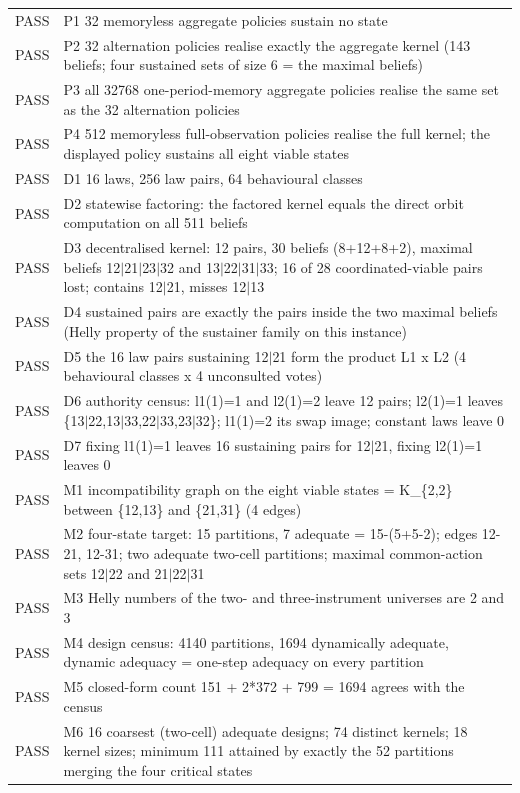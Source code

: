 \documentclass[11pt,a4paper]{article}
\theoremstyle{plain}
\theoremstyle{definition}
\theoremstyle{remark}
\begin{document}
\begin{longtable}{lp{}}
PASS & P1 32 memoryless aggregate policies sustain no state \\
PASS & P2 32 alternation policies realise exactly the aggregate kernel (143 beliefs; four sustained sets of size 6 = the maximal beliefs) \\
PASS & P3 all 32768 one-period-memory aggregate policies realise the same set as the 32 alternation policies \\
PASS & P4 512 memoryless full-observation policies realise the full kernel; the displayed policy sustains all eight viable states \\
PASS & D1 16 laws, 256 law pairs, 64 behavioural classes \\
PASS & D2 statewise factoring: the factored kernel equals the direct orbit computation on all 511 beliefs \\
PASS & D3 decentralised kernel: 12 pairs, 30 beliefs (8+12+8+2), maximal beliefs 12$|$21$|$23$|$32 and 13$|$22$|$31$|$33; 16 of 28 coordinated-viable pairs lost; contains 12$|$21, misses 12$|$13 \\
PASS & D4 sustained pairs are exactly the pairs inside the two maximal beliefs (Helly property of the sustainer family on this instance) \\
PASS & D5 the 16 law pairs sustaining 12$|$21 form the product L1 x L2 (4 behavioural classes x 4 unconsulted votes) \\
PASS & D6 authority census: l1(1)=1 and l2(1)=2 leave 12 pairs; l2(1)=1 leaves \{13$|$22,13$|$33,22$|$33,23$|$32\}; l1(1)=2 its swap image; constant laws leave 0 \\
PASS & D7 fixing l1(1)=1 leaves 16 sustaining pairs for 12$|$21, fixing l2(1)=1 leaves 0 \\
PASS & M1 incompatibility graph on the eight viable states = K\_\{2,2\} between \{12,13\} and \{21,31\} (4 edges) \\
PASS & M2 four-state target: 15 partitions, 7 adequate = 15-(5+5-2); edges 12-21, 12-31; two adequate two-cell partitions; maximal common-action sets 12$|$22 and 21$|$22$|$31 \\
PASS & M3 Helly numbers of the two- and three-instrument universes are 2 and 3 \\
PASS & M4 design census: 4140 partitions, 1694 dynamically adequate, dynamic adequacy = one-step adequacy on every partition \\
PASS & M5 closed-form count 151 + 2*372 + 799 = 1694 agrees with the census \\
PASS & M6 16 coarsest (two-cell) adequate designs; 74 distinct kernels; 18 kernel sizes; minimum 111 attained by exactly the 52 partitions merging the four critical states \\

\end{longtable}
\end{document}
